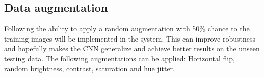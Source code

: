 \subsection{Data augmentation}

Following \cite{monodepth2} the ability to apply a random augmentation with 50\% chance to the training images will be implemented in the system. This can improve robustness and hopefully makes the CNN generalize and achieve better results on the unseen testing data. The following augmentations can be applied: Horizontal flip, random brightness, contrast, saturation and hue jitter.